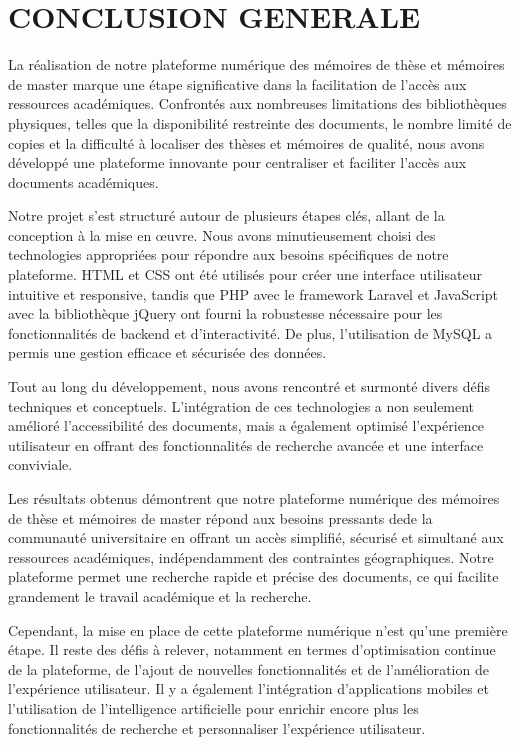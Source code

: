 \chapter*{CONCLUSION GENERALE}
\adjustmtc
\thispagestyle{MyStyle}


La réalisation de notre plateforme numérique des mémoires de thèse et mémoires de master marque une étape significative dans la facilitation de l'accès aux ressources académiques. Confrontés aux nombreuses limitations des bibliothèques physiques, telles que la disponibilité restreinte des documents, le nombre limité de copies et la difficulté à localiser des thèses et mémoires de qualité, nous avons développé une plateforme innovante pour centraliser et faciliter l'accès aux documents académiques.

Notre projet s'est structuré autour de plusieurs étapes clés, allant de la conception à la mise en œuvre. Nous avons minutieusement choisi des technologies appropriées pour répondre aux besoins spécifiques de notre plateforme. HTML et CSS ont été utilisés pour créer une interface utilisateur intuitive et responsive, tandis que PHP avec le framework Laravel et JavaScript avec la bibliothèque jQuery ont fourni la robustesse nécessaire pour les fonctionnalités de backend et d'interactivité. De plus, l'utilisation de MySQL a permis une gestion efficace et sécurisée des données.

Tout au long du développement, nous avons rencontré et surmonté divers défis techniques et conceptuels. L'intégration de ces technologies a non seulement amélioré l'accessibilité des documents, mais a également optimisé l'expérience utilisateur en offrant des fonctionnalités de recherche avancée et une interface conviviale.

Les résultats obtenus démontrent que notre plateforme numérique des mémoires de thèse et mémoires de master répond aux besoins pressants dede la communauté universitaire en offrant un accès simplifié, sécurisé et simultané aux ressources académiques, indépendamment des contraintes géographiques. Notre plateforme permet une recherche rapide et précise des documents, ce qui facilite grandement le travail académique et la recherche.

Cependant, la mise en place de cette plateforme numérique n'est qu'une première étape. Il reste des défis à relever, notamment en termes d'optimisation continue de la plateforme, de l'ajout de nouvelles fonctionnalités et de l'amélioration de l'expérience utilisateur. Il y a également l'intégration d'applications mobiles et l'utilisation de l'intelligence artificielle pour enrichir encore plus les fonctionnalités de recherche et personnaliser l'expérience utilisateur.

